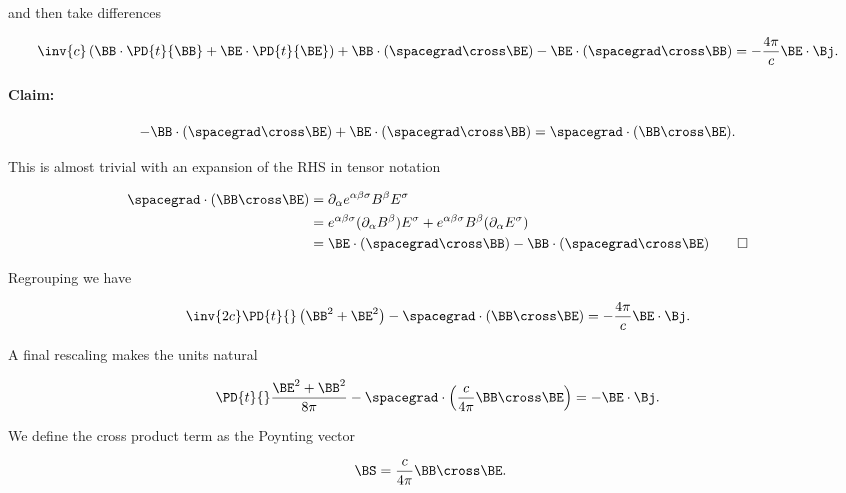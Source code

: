 and then take differences

\begin{equation}\label{eqn:relativisticElectrodynamicsL16:570}
\inv{c} \left(
\BB \cdot \PD{t}{\BB}
+ \BE \cdot \PD{t}{\BE} \right) + \BB \cdot (\spacegrad \cross \BE) -\BE \cdot (\spacegrad \cross \BB) =
-\frac{4 \pi}{c} \BE \cdot \Bj.
\end{equation}

\paragraph{Claim:}

\begin{equation}\label{eqn:relativisticElectrodynamicsL16:590}
-\BB \cdot (\spacegrad \cross \BE) +\BE \cdot (\spacegrad \cross \BB) = \spacegrad \cdot ( \BB \cross \BE ).
\end{equation}

This is almost trivial with an expansion of the RHS in tensor notation

\begin{align*}
\spacegrad \cdot ( \BB \cross \BE )
&=
\partial_\alpha e^{\alpha \beta \sigma} B^\beta E^\sigma \\
&=
e^{\alpha \beta \sigma} (\partial_\alpha B^\beta) E^\sigma
+
e^{\alpha \beta \sigma} B^\beta (\partial_\alpha E^\sigma) \\
&=
\BE \cdot (\spacegrad \cross \BB)
-\BB \cdot (\spacegrad \cross \BE)\qquad \square
\end{align*}

Regrouping we have

\begin{equation}\label{eqn:relativisticElectrodynamicsL16:610}
\inv{2 c} \PD{t}{} \left(
\BB^2 + \BE^2 \right) - \spacegrad \cdot ( \BB \cross \BE )
=
-\frac{4 \pi}{c} \BE \cdot \Bj.
\end{equation}

A final rescaling makes the units natural

\begin{equation}\label{eqn:relativisticElectrodynamicsL16:630}
\PD{t}{} \frac{ \BE^2 + \BB^2 }{8 \pi} - \spacegrad \cdot \left( \frac{c}{4 \pi} \BB \cross \BE \right) = - \BE \cdot \Bj.
\end{equation}

We define the cross product term as the Poynting vector

\begin{align}\label{eqn:relativisticElectrodynamicsL16:650}
\BS &= \frac{c}{4 \pi} \BB \cross \BE.
\end{align}

